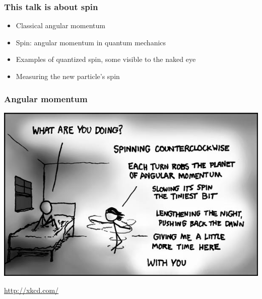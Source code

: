 \documentclass[compress]{beamer}
\begin{document}
\begin{frame}
\frametitle{This talk is about spin}
\begin{center}
\begin{minipage}{0.8\linewidth}
\begin{itemize}\setlength{\itemsep}{0.5 cm}
\item Classical angular momentum
\item Spin: angular momentum in quantum mechanics
\item Examples of quantized spin, some visible to the naked eye
\item Measuring the new particle's spin
\end{itemize}
\end{minipage}
\end{center}
\end{frame}

\begin{frame}
\frametitle{Angular momentum}
\includegraphics[width=\linewidth]{angular_momentum.jpg}

\hfill \textcolor{blue}{\scriptsize \url{http://xkcd.com/}}
\end{frame}
\end{document}
